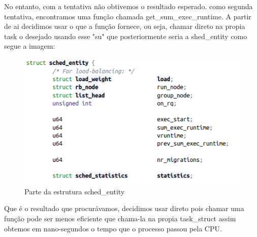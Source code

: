 \documentclass[12pt]{article}
\begin{document}
	No entanto, com a tentativa não obtivemos o resultado esperado.
como segunda tentativa, encontramos uma função chamada get\_sum\_exec\_runtime. A partir de ai decidimos usar o que a função fornece, ou seja, chamar direto na propia task o desejado usando esse "su" que posteriormente seria a shed\_entity como segue a imagem:
 
\begin{figure}[!htb]
	\centering
	\includegraphics[scale=0.6]{imagens/img2.png}
	\caption{Parte da estrutura sched\_entity}
	\label{schedentity}
\end{figure}

	Que é o resultado que procurávamos, decidimos usar direto pois chamar uma função pode ser menos eficiente que chama-la na propia task\_struct assim obtemos em nano-segundos o tempo que o processo passou pela CPU.
\end{document}
